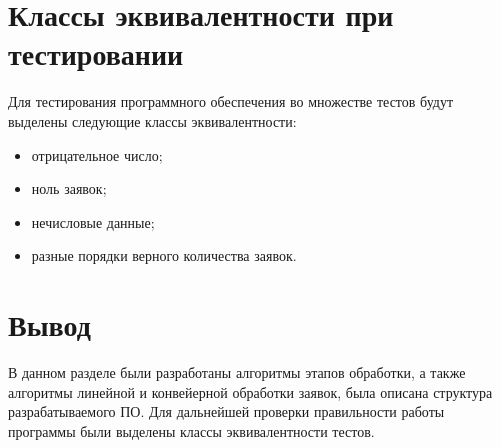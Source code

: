 \section{Классы эквивалентности при тестировании}

Для тестирования программного обеспечения во множестве тестов будут выделены
следующие классы эквивалентности:
\begin{itemize}[left=\parindent]
    \item отрицательное число;
    \item ноль заявок; 
    \item нечисловые данные;
    \item разные порядки верного количества заявок.
\end{itemize}

\section{Вывод}

В данном разделе были разработаны алгоритмы этапов обработки, а также алгоритмы
линейной и конвейерной обработки заявок, была описана структура
разрабатываемого ПО.  Для дальнейшей проверки правильности работы программы
были выделены классы эквивалентности тестов.
